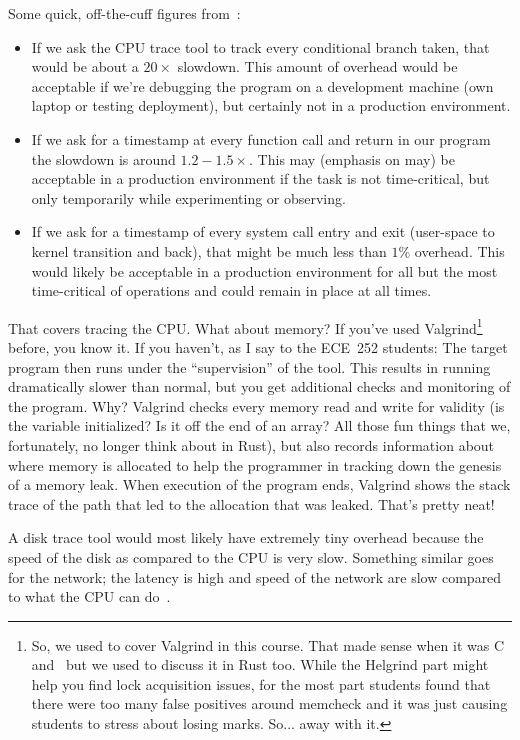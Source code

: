 Some quick, off-the-cuff figures from~\cite{usd}:
\begin{itemize}
	\item If we ask the CPU trace tool to track every conditional branch taken, that would be about a $20\times$ slowdown. This amount of overhead would be acceptable if we're debugging the program on a development machine (own laptop or testing deployment), but certainly not in a production environment.
	\item If we ask for a timestamp at every function call and return in our program the slowdown is around $1.2-1.5\times$. This may (emphasis on may) be acceptable in a production environment if the task is not time-critical, but only temporarily while experimenting or observing.
	\item If we ask for a timestamp of every system call entry and exit (user-space to kernel transition and back), that might be much less than $1\%$ overhead. This would likely be acceptable in a production environment for all but the most time-critical of operations and could remain in place at all times.
\end{itemize}

That covers tracing the CPU. What about memory? If you've used Valgrind\footnote{So, we used to cover Valgrind in this course. That made sense when it was C and \CPP~but we used to discuss it in Rust too. While the Helgrind part might help you find lock acquisition issues, for the most part students found that there were too many false positives around memcheck and it was just causing students to stress about losing marks. So... away with it.} before, you know it. If you haven't, as I say to the ECE~252 students: The target program then runs under the ``supervision'' of the tool. This results in running dramatically slower than normal, but you get additional checks and monitoring of the program. Why? Valgrind checks every memory read and write for validity (is the variable initialized? Is it off the end of an array? All those fun things that we, fortunately, no longer think about in Rust), but also records information about where memory is allocated to help the programmer in tracking down the genesis of a memory leak. When execution of the program ends, Valgrind shows the stack trace of the path that led to the allocation that was leaked. That's pretty neat!

A disk trace tool would most likely have extremely tiny overhead because the speed of the disk as compared to the CPU is very slow. Something similar goes for the network; the latency is high and speed of the network are slow compared to what the CPU can do~\cite{usd}. 


